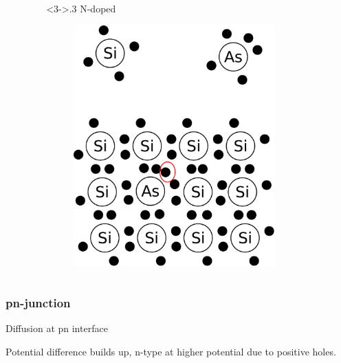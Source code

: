 \documentclass[beamer]{standalone}
\begin{document}
\begin{frame}
\begin{columns}[t]
\begin{column}
\begin{figure}
    \end{figure}
  \end{column}
  \begin{column}<3->{.3\textwidth}
    N-doped
    \begin{figure}
      \includegraphics[width=0.80\textwidth]{./pics/ndopped}
    \end{figure}
  \end{column}
 \end{columns}
\end{frame}

\begin{frame}
 \frametitle{pn-junction}
 \begin{block}{Diffusion at pn interface}
  \begin{center}
  \end{center}
  Potential difference builds up, n-type at higher potential due to positive holes.
 \end{block}
\end{frame}
\end{document}
